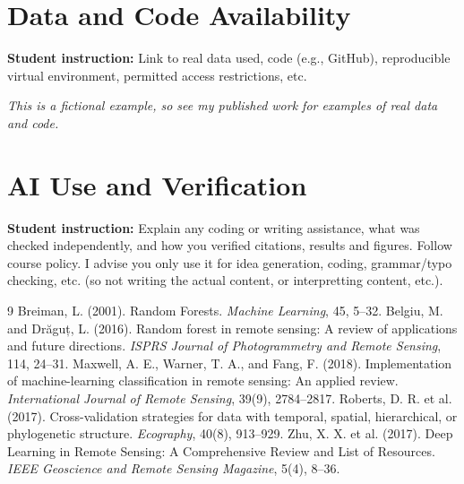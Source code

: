 \documentclass[11pt,letterpaper]{article}
\newcommand{\guide}[1]{\par\begingroup\color{blue!60!black}\small\textbf{Student
instruction:} #1\par\endgroup}
\begin{document}
\section*{Data and Code Availability}
\guide{Link to real data used, code (e.g., GitHub), reproducible virtual environment, permitted access
restrictions, etc.}\emph{This is a fictional example, so see my published work for examples of real data and code.}
\section*{AI Use and Verification}
\guide{Explain any coding or writing assistance, what was checked independently, and how
you verified citations, results and figures. Follow course policy. I advise you only use it for idea generation, coding, 
grammar/typo checking, etc. (so not writing the actual content, or interpretting content, etc.).}
\begin{thebibliography}{9}
 Breiman, L. (2001). Random Forests. \emph{Machine
Learning}, 45, 5--32.
 Belgiu, M. and Drăguț, L. (2016). Random
forest in remote sensing: A review of applications and future directions. \emph{ISPRS
Journal of Photogrammetry and Remote Sensing}, 114, 24--31.
 Maxwell, A. E., Warner, T. A., and Fang, F.
(2018). Implementation of machine-learning classification in remote sensing: An applied
review. \emph{International Journal of Remote Sensing}, 39(9), 2784--2817.
 Roberts, D. R. et al. (2017). Cross-validation
strategies for data with temporal, spatial, hierarchical, or phylogenetic structure.
\emph{Ecography}, 40(8), 913--929.
 Zhu, X. X. et al. (2017). Deep Learning in Remote
Sensing: A Comprehensive Review and List of Resources. \emph{IEEE Geoscience and Remote
Sensing Magazine}, 5(4), 8--36.
\end{thebibliography}
\end{document}
